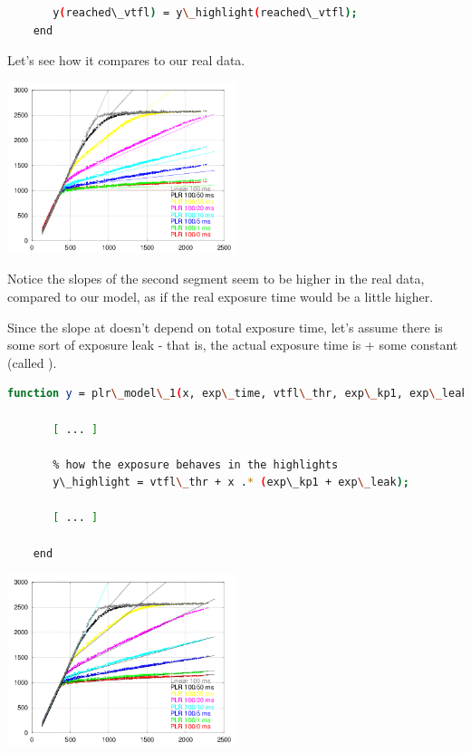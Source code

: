 {\begin{lstlisting}[language=bash,morekeywords=$,keywordstyle=\bfseries,frame=none,xleftmargin=.25in,belowskip=2em, aboveskip=2em]
       % copy highlight values only for those pixels that reached Vtfl
       y(reached\_vtfl) = y\_highlight(reached\_vtfl);
    end
\end{lstlisting}

Let's see how it compares to our real data. \\

\begin{center}
\includegraphics[height=5cm]{images/100-x-32-plr-vs-30ms-lin-model0}
\end{center}

Notice the slopes of the second segment seem to be higher in the real data, compared to our model, as if the real exposure time would be a little higher.

Since the slope at  doesn't depend on total exposure time, let's assume there is some sort of exposure leak - that is, the actual exposure time is  + some constant (called  ). 


\begin{lstlisting}[language=bash,morekeywords=$,keywordstyle=\bfseries,frame=none,xleftmargin=.25in,belowskip=2em, aboveskip=2em]
    function y = plr\_model\_1(x, exp\_time, vtfl\_thr, exp\_kp1, exp\_leak)
      
       [ ... ]  
      
       % how the exposure behaves in the highlights
       y\_highlight = vtfl\_thr + x .* (exp\_kp1 + exp\_leak);
      
       [ ... ]  
      
    end
\end{lstlisting}

\begin{center}
\includegraphics[height=5cm]{images/100-x-32-plr-vs-30ms-lin-model1}
\end{center}

}
